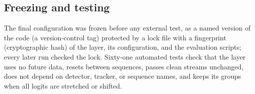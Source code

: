 

\subsection{Freezing and testing}\label{sec:freeze}
The final configuration was frozen before any external test, as a named version of the code
(a version-control tag) protected by a lock file with a fingerprint (cryptographic hash) of the
layer, its configuration, and the evaluation scripts; every later run checked the lock. Sixty-one
automated tests check that the layer uses no future data, resets between sequences, passes clean
streams unchanged, does not depend on detector, tracker, or sequence names, and keeps its groups
when all logits are stretched or shifted.
